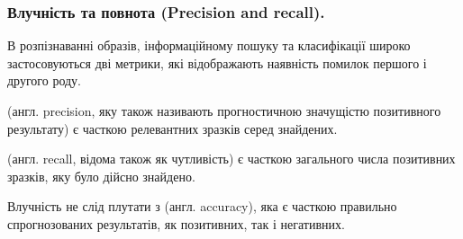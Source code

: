 \subsubsection{Влучність та повнота (Precision and recall).}
\vspace*{-1em}
В розпізнаванні образів, інформаційному пошуку та класифікації широко застосовуються дві метрики, які відображають наявність помилок першого і другого роду.
\begin{defo}
 (англ. precision, яку також називають прогностичною значущістю позитивного результату) є часткою релевантних зразків серед знайдених.
\end{defo}
\begin{defo}
   (англ. recall, відома також як чутливість) є часткою загального числа позитивних зразків, яку було дійсно знайдено.
\end{defo}
Влучність не слід плутати з  (англ. accuracy), яка є часткою правильно спрогнозованих результатів, як позитивних, так і негативних.

